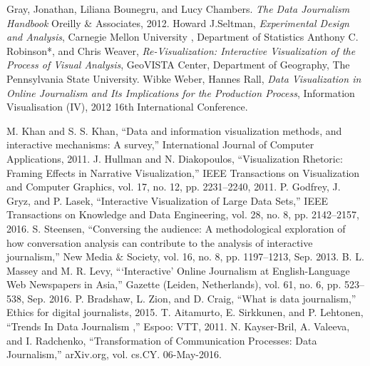 \documentclass[9pt,journal,compsoc]{IEEEtran}
\begin{document}
\begin{thebibliography}{99}
{} Gray, Jonathan, Liliana Bounegru, and Lucy Chambers. \textit{The Data Journalism Handbook} Oreilly \& Associates, 2012.
 Howard J.Seltman, \textit{Experimental Design and Analysis}, Carnegie Mellon University , Department of Statistics
 Anthony C. Robinson*, and Chris Weaver, \textit{Re-Visualization: Interactive Visualization of the Process of Visual Analysis}, GeoVISTA Center, Department of Geography, The Pennsylvania State University. 
 Wibke Weber, Hannes Rall, \textit{Data Visualization in Online Journalism and Its Implications for the Production Process}, Information Visualisation (IV), 2012 16th International Conference.

 M. Khan and S. S. Khan, “Data and information visualization methods, and interactive mechanisms: A survey,” International Journal of Computer Applications, 2011.
 J. Hullman and N. Diakopoulos, “Visualization Rhetoric: Framing Effects in Narrative Visualization,” IEEE Transactions on Visualization and Computer Graphics, vol. 17, no. 12, pp. 2231–2240, 2011.
 P. Godfrey, J. Gryz, and P. Lasek, “Interactive Visualization of Large Data Sets,” IEEE Transactions on Knowledge and Data Engineering, vol. 28, no. 8, pp. 2142–2157, 2016.
 S. Steensen, “Conversing the audience: A methodological exploration of how conversation analysis can contribute to the analysis of interactive journalism,” New Media \& Society, vol. 16, no. 8, pp. 1197–1213, Sep. 2013.
 B. L. Massey and M. R. Levy, “`Interactive' Online Journalism at English-Language Web Newspapers in Asia,” Gazette (Leiden, Netherlands), vol. 61, no. 6, pp. 523–538, Sep. 2016.
 P. Bradshaw, L. Zion, and D. Craig, “What is data journalism,” Ethics for digital journalists, 2015.
 T. Aitamurto, E. Sirkkunen, and P. Lehtonen, “Trends In Data Journalism ,” Espoo: VTT, 2011.
 N. Kayser-Bril, A. Valeeva, and I. Radchenko, “Transformation of Communication Processes: Data Journalism,” arXiv.org, vol. cs.CY. 06-May-2016. 


\end{thebibliography}
\end{document}
